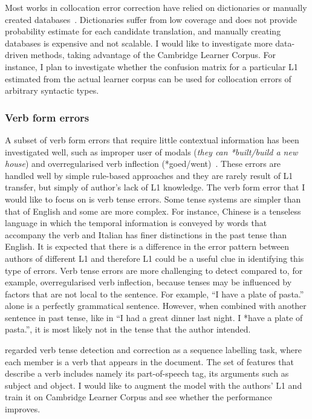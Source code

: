 \documentclass[11pt]{article}
\begin{document}
Most works in collocation error correction have relied on dictionaries or manually created databases~\citep{shei2000esl, wible2003bootstrapping, futagi2008computational}. Dictionaries suffer from low coverage and does not provide probability estimate for each candidate translation, and manually creating databases is expensive and not scalable. I would like to investigate more data-driven methods, taking advantage of the Cambridge Learner Corpus. For instance, I plan to investigate whether the confusion matrix for a particular L1 estimated from the actual learner corpus can be used for collocation errors of arbitrary syntactic types.

\subsubsection{Verb form errors}
\label{subsub:verb}
A subset of verb form errors that require little contextual information has been investigated well, such as improper user of modals (\emph{they can *built/build a new house}) and overregularised verb inflection (*goed/went)~\citep{chodorow2000unsupervised, leacock2003automated}. These errors are handled well by simple rule-based approaches and they are rarely result of L1 transfer, but simply of author's lack of L1 knowledge. The verb form error that I would like to focus on is verb tense errors. Some tense systems are simpler than that of English and some are more complex. For instance, Chinese is a tenseless language in which the temporal information is conveyed by words that accompany the verb and Italian has finer distinctions in the past tense than English. It is expected that there is a difference in the error pattern between authors of different L1 and therefore L1 could be a useful clue in identifying this type of errors. Verb tense errors are more challenging to detect compared to, for example, overregularised verb inflection, because tenses may be influenced by factors that are not local to the sentence. For example, ``I have a plate of pasta.'' alone is a perfectly grammatical sentence. However, when combined with another sentence in past tense, like in ``I had a great dinner last night. I *have a plate of pasta.'', it is most likely not in the tense that the author intended.

\cite{tajiri2012tense} regarded verb tense detection and correction as a sequence labelling task, where each member is a verb that appears in the document. The set of features that describe a verb includes namely its part-of-speech tag, its arguments such as subject and object. I would like to augment the model with the authors' L1 and train it on Cambridge Learner Corpus and see whether the performance improves.
\end{document}
